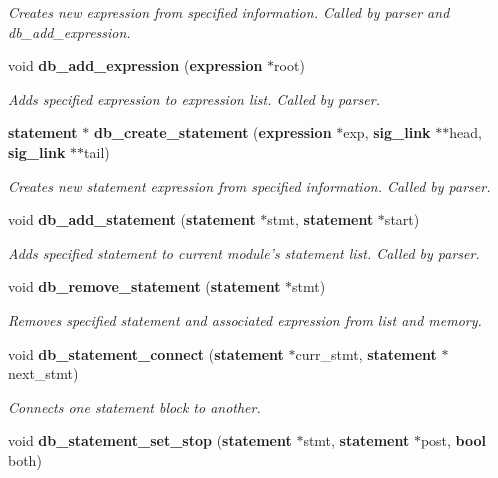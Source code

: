 \begin{CompactItemize}
\begin{CompactList}\small\item\em Creates new expression from specified information. Called by parser and db\_\-add\_\-expression. \item\end{CompactList}\item 
void {\bf db\_\-add\_\-expression} ({\bf expression} $\ast$root)
\begin{CompactList}\small\item\em Adds specified expression to expression list. Called by parser. \item\end{CompactList}\item 
{\bf statement} $\ast$ {\bf db\_\-create\_\-statement} ({\bf expression} $\ast$exp, {\bf sig\_\-link} $\ast$$\ast$head, {\bf sig\_\-link} $\ast$$\ast$tail)
\begin{CompactList}\small\item\em Creates new statement expression from specified information. Called by parser. \item\end{CompactList}\item 
void {\bf db\_\-add\_\-statement} ({\bf statement} $\ast$stmt, {\bf statement} $\ast$start)
\begin{CompactList}\small\item\em Adds specified statement to current module's statement list. Called by parser. \item\end{CompactList}\item 
void {\bf db\_\-remove\_\-statement} ({\bf statement} $\ast$stmt)
\begin{CompactList}\small\item\em Removes specified statement and associated expression from list and memory. \item\end{CompactList}\item 
void {\bf db\_\-statement\_\-connect} ({\bf statement} $\ast$curr\_\-stmt, {\bf statement} $\ast$next\_\-stmt)
\begin{CompactList}\small\item\em Connects one statement block to another. \item\end{CompactList}\item 
void {\bf db\_\-statement\_\-set\_\-stop} ({\bf statement} $\ast$stmt, {\bf statement} $\ast$post, {\bf bool} both)

\end{CompactItemize}
